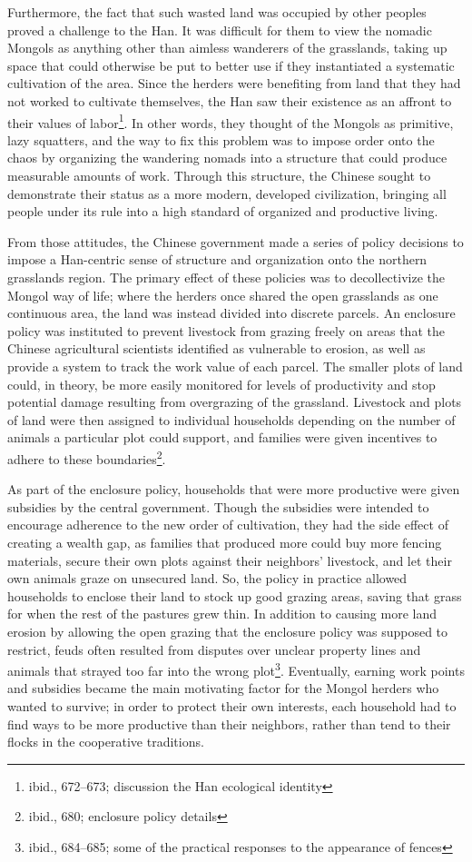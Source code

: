 Furthermore, the fact that such wasted land was occupied by other peoples proved
a challenge to the Han. It was difficult for them to view the nomadic Mongols as
anything other than aimless wanderers of the grasslands, taking up space that
could otherwise be put to better use if they instantiated a systematic
cultivation of the area. Since the herders were benefiting from land that they
had not worked to cultivate themselves, the Han saw their existence as an
affront to their values of labor\footnote{ibid., 672--673; discussion the Han
ecological identity}. In other words, they thought of the Mongols as primitive,
lazy squatters, and the way to fix this problem was to impose order onto the
chaos by organizing the wandering nomads into a structure that could produce
measurable amounts of work. Through this structure, the Chinese sought to
demonstrate their status as a more modern, developed civilization, bringing all
people under its rule into a high standard of organized and productive living.

From those attitudes, the Chinese government made a series of policy decisions
to impose a Han-centric sense of structure and organization onto the northern
grasslands region. The primary effect of these policies was to decollectivize
the Mongol way of life; where the herders once shared the open grasslands as one
continuous area, the land was instead divided into discrete parcels. An
enclosure policy was instituted to prevent livestock from grazing freely on
areas that the Chinese agricultural scientists identified as vulnerable to
erosion, as well as provide a system to track the work value of each parcel.
The smaller plots of land could, in theory, be more easily monitored for levels
of productivity and stop potential damage resulting from overgrazing of the
grassland. Livestock and plots of land were then assigned to individual
households depending on the number of animals a particular plot could support,
and families were given incentives to adhere to these boundaries\footnote{ibid.,
680; enclosure policy details}.

As part of the enclosure policy, households that were more productive were given
subsidies by the central government. Though the subsidies were intended to
encourage adherence to the new order of cultivation, they had the side effect of
creating a wealth gap, as families that produced more could buy more fencing
materials, secure their own plots against their neighbors' livestock, and let
their own animals graze on unsecured land. So, the policy in practice allowed
households to enclose their land to stock up good grazing areas, saving that
grass for when the rest of the pastures grew thin. In addition to causing more
land erosion by allowing the open grazing that the enclosure policy was supposed
to restrict, feuds often resulted from disputes over unclear property lines and
animals that strayed too far into the wrong plot\footnote{ibid., 684--685; some
of the practical responses to the appearance of fences}.  Eventually, earning
work points and subsidies became the main motivating factor for the Mongol
herders who wanted to survive; in order to protect their own interests, each
household had to find ways to be more productive than their neighbors, rather
than tend to their flocks in the cooperative traditions.

